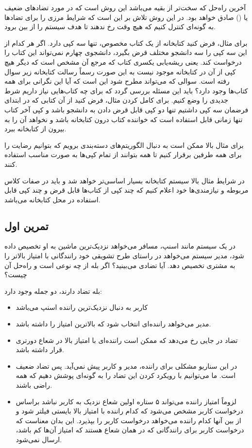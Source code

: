 آخرین راه‌حل که سخت‌تر از بقیه می‌باشد این روش است که در مورد تضاد‌های ضعیف یا
() صادق خواهد بود. در این روش تلاش بر این است که شرایط مرزی را
برای تضاد‌ها به گونه‌ای کنترل کنیم که هیچ وقت رخ ندهند تا هدف سیستم را از بین
برود.

برای مثال، فرض کنید کتابخانه از یک کتاب مخصوص، تنها سه کپی دارد. اگر هر کدام از
این سه کپی را سه دانشجو مختلف قرض بگیرد، دانشجوی چهارم نمی‌تواند این کتاب را
درخواست کند. یعنی ریشه‌یابی یکسری کتاب که مرجع آن مشخص است که دیگر هیچ کپی از آن
در کتابخانه موجود نیست به این صورت رسماً رسالت کتابخانه زیر سوال رفته است. سوالی
که می‌تواند مطرح شود این است که آیا این نگرانی برای همه کتاب‌ها وجود دارد؟ باید
این مسئله بررسی گردد که برای چه کتاب‌هایی نیاز داریم شرط جدیدی را وضع کنیم. برای
کامل کردن مثال، فرض کنید از آن کتابی که در ابتدای فرضمان سه کپی داشتیم تنها دو
کپی قابل قرض دادن به دانشجو باشد و کپی آخر کتاب تنها زمانی قابل استفاده است که
خواننده کتاب درون کتابخانه باشد و نخواهد آن را به بیرون از کتابخانه ببرد.

برای مثال بالا ممکن است به دنبال الگوریتم‌های دسته‌بندی برویم که بتوانیم رضایت
را برای همه طرفین برقرار کنیم تا همه بتوانند از تمام کپی‌ها به صورت مناسب
استفاده کنند.

در شرایط مثال بالا سیستم کتابخانه بسیار اساسی‌تر خواهد شد و باید در صفات کلاس
مربوطه و نیازمندی‌ها خود اعلام کنیم که چند کپی از کتاب‌ها قابل قرض و چند کپی
قابل استفاده در محل کتابخانه می‌باشد.

\subsection{تمرین اول}

در یک سیستم مانند اسنپ، مسافر می‌خواهد نزدیک‌ترین ماشین به او تخصیص داده شود،
مدیر سیستم می‌خواهد در راستای طرح تشویقی خود رانندگانی با امتیاز بالاتر را به
مشتری تخصیص دهد. آیا تضادی می‌بینید؟ اگر بله از چه نوعی است و راه‌حل آن چیست؟

بله تضاد دارند، دو جمله وجود دارد:

\begin{itemize}
    \item کاربر به دنبال نزدیک‌ترین راننده اسنپ می‌باشد
    \item مدیر می‌خواهد راننده‌ای انتخاب شود که بالاترین امتیاز را داشته باشد.
    \item تضاد در جایی رخ می‌دهد که ممکن است راننده‌ای با امتیاز بالا در شعاع
    دورتری قرار داشته باشد.
    \item در این سناریو مشکلی برای راننده، مدیر و کاربر پیش نمی‌آید. پس تضاد
    ضعیف است. ما می‌توانیم با رویکرد  کردن این تضاد را به گونه‌ای
    پوشش دهیم که همه راضی باشند.
    \item لزوماً امتیاز راننده می‌تواند ۵ ستاره اولین شعاع نزدیک به کاربر نباشد
    براساس درخواست کاربر مشخص می‌شود که کدام راننده با امتیاز بالا بایستی فیلتر
    شود و از بین آنها کدام راننده می‌خواهد درخواست کاربر را بپذیرد. این بدان
    معناست که درخواست کاربر برای رانندگانی که در همان شعاع هستند که امتیاز آن‌ها
    کم باشد، ارسال نمی‌شود.
\end{itemize}

